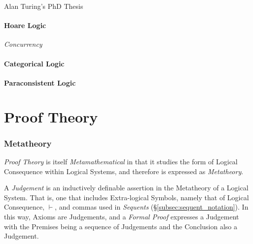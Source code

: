 \documentclass{article}
\begin{document}
Alan Turing's PhD Thesis \cite{turing38}

\subsection{Hoare Logic}

\emph{Concurrency}

\subsection{Categorical Logic}

\subsection{Paraconsistent Logic}



\part{Proof Theory}\label{sec:proof_theory}

\section{Metatheory} \label{sec:metatheory}

\emph{Proof Theory} is itself \emph{Metamathematical} in that it
studies the form of Logical Consequence within Logical Systems, and
therefore is expressed as \emph{Metatheory}.

A \emph{Judgement} is an inductively definable assertion in the
Metatheory of a Logical System. That is, one that includes
Extra-logical Symbols, namely that of Logical Consequence, $\vdash$,
and commas used in \emph{Sequents}
(\S\ref{subsec:sequent_notation}). In this way, Axioms are Judgements,
and a \emph{Formal Proof} expresses a Judgement with the Premises
being a sequence of Judgements and the Conclusion also a Judgement.
\end{document}
